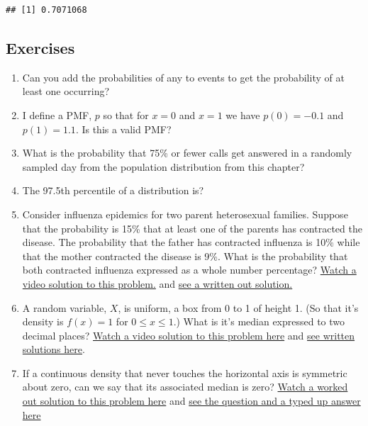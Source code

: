 \documentclass[]{article}
\begin{document}
\begin{verbatim}
## [1] 0.7071068
\end{verbatim}

\subsection{Exercises}\label{exercises-1}

\begin{enumerate}
\def\labelenumi{\arabic{enumi}.}
\itemsep1pt\parskip0pt
\item
  Can you add the probabilities of any to events to get the probability
  of at least one occurring?
\item
  I define a PMF, $p$ so that for $x = 0$ and $x=1$ we have
  $p(0) = -0.1$ and $p(1)  = 1.1$. Is this a valid PMF?
\item
  What is the probability that 75\% or fewer calls get answered in a
  randomly sampled day from the population distribution from this
  chapter?
\item
  The 97.5th percentile of a distribution is?
\item
  Consider influenza epidemics for two parent heterosexual families.
  Suppose that the probability is 15\% that at least one of the parents
  has contracted the disease. The probability that the father has
  contracted influenza is 10\% while that the mother contracted the
  disease is 9\%. What is the probability that both contracted influenza
  expressed as a whole number percentage?
  \href{http://youtu.be/CvnmoCuIN08?list=PLpl-gQkQivXhHOcVeU3bSJg78zaDYbP9L}{Watch
  a video solution to this problem.} and
  \href{http://bcaffo.github.io/courses/06_StatisticalInference/homework/hw1.html\#3}{see
  a written out solution.}
\item
  A random variable, $X$, is uniform, a box from 0 to 1 of height 1. (So
  that it's density is $f(x) = 1$ for $0\leq x \leq 1$.) What is it's
  median expressed to two decimal places?
  \href{http://youtu.be/UXcarD-1xAM?list=PLpl-gQkQivXhHOcVeU3bSJg78zaDYbP9L}{Watch
  a video solution to this problem here} and
  \href{http://bcaffo.github.io/courses/06_StatisticalInference/homework/hw1.html\#4}{see
  written solutions here}.
\item
  If a continuous density that never touches the horizontal axis is
  symmetric about zero, can we say that its associated median is zero?
  \href{http://youtu.be/sn48CGH_TXI?list=PLpl-gQkQivXhHOcVeU3bSJg78zaDYbP9L}{Watch
  a worked out solution to this problem here} and
  \href{http://bcaffo.github.io/courses/06_StatisticalInference/homework/hw1.html\#9}{see
  the question and a typed up answer here}
\end{enumerate}
\end{document}
